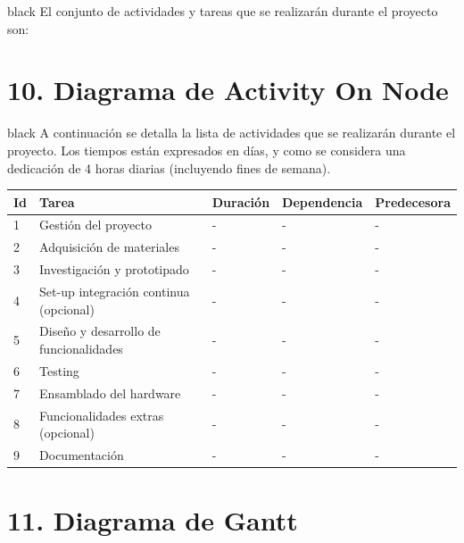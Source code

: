 \documentclass[
11pt, %
]{charter}
\begin{document}
\begin{consigna}{black}
El conjunto de actividades y tareas que se realizarán durante el proyecto son:


\end{consigna}

\section{10. Diagrama de Activity On Node}
\label{sec:AoN}

\begin{consigna}{black}
A continuación se detalla la lista de actividades que se realizarán durante el proyecto. Los tiempos están expresados en días, y como se considera una dedicación de 4 horas diarias (incluyendo fines de semana). 

\begin{table}[ht]
\begin{tabularx}{\linewidth}{@{}|l|X|l|l|l|@{}}
\hline
\rowcolor[HTML]{C0C0C0} 
Id	& Tarea           									& Duración 			& Dependencia	& Predecesora 	\\ \hline
1	& Gestión del proyecto 								& -		& -				&  - 		\\ \hline
2	& Adquisición de materiales 						& -	& -				&  -      		\\ \hline
3	& Investigación y prototipado						& -		& -				&  -      		\\ \hline
4	& Set-up integración continua (opcional)			& -   	& -        		&  -			\\ \hline
5	& Diseño y desarrollo de funcionalidades    		& -		& -			 	& -			\\ \hline
6	& Testing								    		& -		& -				& -			\\ \hline
7	& Ensamblado del hardware				    		& -		& -				& -				\\ \hline
8	& Funcionalidades extras (opcional)					& -		& -				& - 			\\ \hline
9	& Documentación    									& -		& -			 	& -				\\ \hline

\end{tabularx}
\end{table}

\end{consigna}


\section{11. Diagrama de Gantt}
\label{sec:gantt}
\end{document}
